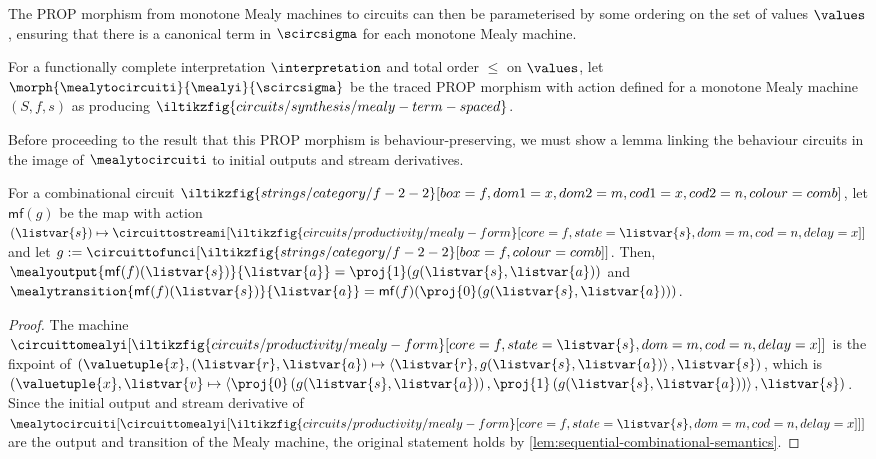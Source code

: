 The PROP morphism from monotone Mealy machines to circuits can then be
parameterised by some ordering on the set of values \(\values\), ensuring that
there is a canonical term in \(\scircsigma\) for each monotone Mealy machine.

\begin{definition}\label{def:mealy-to-circuit}
    For a functionally complete interpretation \(\interpretation\) and total
    order \(\leq\) on \(\values\), let \(
    \morph{
        \mealytocircuiti
    }{
        \mealyi
    }{
        \scircsigma
    }
    \) be the traced PROP morphism with action defined for a monotone Mealy
    machine \((S,f,s)\) as producing \(
    \iltikzfig{circuits/synthesis/mealy-term-spaced}
    \).
\end{definition}

Before proceeding to the result that this PROP morphism is behaviour-preserving,
we must show a lemma linking the behaviour circuits in the image of
\(\mealytocircuiti\) to initial outputs and stream derivatives.

\begin{proposition}
    \label{prop:mealy-form-image}
    For a combinational circuit \(
    \iltikzfig{strings/category/f-2-2}[box=f,dom1=x,dom2=m,cod1=x,cod2=n,colour=comb]
    \), let \(\mathsf{mf}(g)\) be the map with action \(
    (\listvar{s}) \mapsto
    \circuittostreami[
        \iltikzfig{circuits/productivity/mealy-form}[core=f,state=\listvar{s},dom=m,cod=n,delay=x]
    ]
    \) and let \(
    g
    :=
    \circuittofunci[
        \iltikzfig{strings/category/f-2-2}[box=f,colour=comb]
    ]
    \).
    Then, \(
    \mealyoutput{\mathsf{mf}(f)(\listvar{s})}{\listvar{a}}
    =
    \proj{1}(g(\listvar{s}, \listvar{a}))
    \) and \(
    \mealytransition{\mathsf{mf}(f)(\listvar{s})}{\listvar{a}}
    =
    \mathsf{mf}(f)(\proj{0}(g(\listvar{s}, \listvar{a})))
    \).
\end{proposition}
\begin{proof}
    The machine \(\circuittomealyi[
        \iltikzfig{circuits/productivity/mealy-form}[core=f,state=\listvar{s},dom=m,cod=n,delay=x]
    ]\) is the fixpoint of \(
    \left(\valuetuple{x},
    (\listvar{r}, \listvar{a}) \mapsto \left\langle
    \listvar{r}, g(\listvar{s}, \listvar{a})
    \right\rangle, \listvar{s}\right)
    \), which is \(
    \left(\valuetuple{x},
    \listvar{v} \mapsto \left\langle
    \proj{0}\left(g(\listvar{s},\listvar{a})\right),
    \proj{1}\left(g(\listvar{s}, \listvar{a})\right)
    \right\rangle, \listvar{s}\right)
    \).
    Since the initial output and stream derivative of \(
    \mealytocircuiti[
        \circuittomealyi[
            \iltikzfig{circuits/productivity/mealy-form}[core=f,state=\listvar{s},dom=m,cod=n,delay=x]
        ]
    ]
    \) are the output and transition of the Mealy machine, the original
    statement holds by \cref{lem:sequential-combinational-semantics}.
\end{proof}

